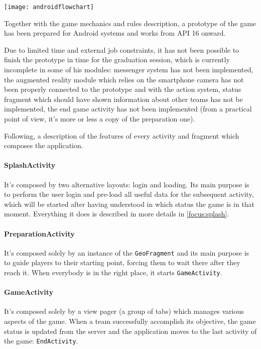		\texttt{[image: androidflowchart]}
		
		Together with the game mechanics and rules description, a prototype of the game has been prepared for Android systems and works from API 16 onward.
			
		Due to limited time and external job constraints, it has not been possible to finish the prototype in time for the graduation session, which is currently incomplete in some of his modules: messenger system has not been implemented, the augmented reality module which relies on the smartphone camera has not been properly connected to the prototype and with the action system, status fragment which should have shown information about other teams has not be implemented, the end game activity has not been implemented (from a practical point of view, it's more or less a copy of the preparation one).
		
		Following, a description of the features of every activity and fragment which composes the application.
		
		\paragraph{SplashActivity}
		
		It's composed by two alternative layouts: login and loading.
		Its main purpose is to perform the user login and pre-load all useful data for the subsequent activity, which will be started after having understood in which status the game is in that moment.
		Everything it does is described in more details in \autoref{focus:splash}.
		
		\paragraph{PreparationActivity}
		
		It's composed solely by an instance of the \lstinline|GeoFragment| and its main purpose is to guide players to their starting point, forcing them to wait there after they reach it. When everybody is in the right place, it starts \lstinline|GameActivity|.
		
		\paragraph{GameActivity}
			
		It's composed solely by a view pager (a group of tabs) which manages various aspects of the game.
		When a team successfully accomplish its objective, the game status is updated from the server and the application moves to the last activity of the game: \lstinline|EndActivity|.
		
